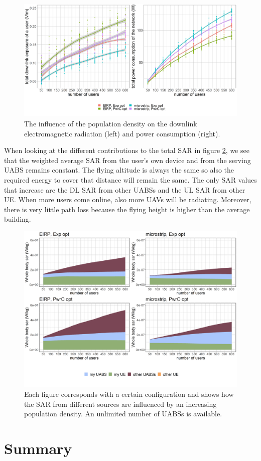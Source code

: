 \begin{figure}[h!]
  \includegraphics[width=\textwidth]{../results/s3/uvsdlAndPc.png}
  \caption{The influence of the population density on the downlink electromagnetic radiation (left) and power consumption (right).}
  \label{fig:s3b_dlAndPC}
\end{figure}

When looking at the different contributions to the total \gls{SAR} in figure \ref{fig:s3b_fourSourcesMatrix}, 
we see that the weighted average 
\gls{SAR} from the user's own device and from the serving \gls{UABS} remains constant. The flying altitude is always the same so 
also the required energy to cover that distance will remain the same. 
The only \gls{SAR} values that increase are the \gls{DL} \gls{SAR} from other \gls{UABS}s and the \gls{UL} \gls{SAR} from other \gls{UE}. 
When more users come online, also more \gls{UAV}s will be radiating. Moreover, there is very little path loss because the flying height is higher than the average building.

\begin{figure}[h!]
  \includegraphics[width=\textwidth]{../results/s3/uFourSources.png}
  \caption{Each figure corresponds with a certain configuration and shows how the \gls{SAR} 
  from different sources are influenced by an increasing population density. An unlimited number of \gls{UABS}s is available.
  }
  \label{fig:s3b_fourSourcesMatrix}
\end{figure}


\section{Summary}

